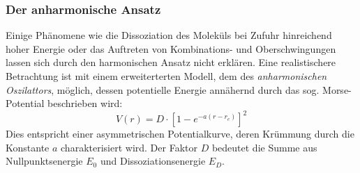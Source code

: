 \documentclass{article}
\begin{document}
\subsubsection{Der anharmonische Ansatz}
Einige Phänomene wie die Dissoziation des Moleküls bei Zufuhr
hinreichend hoher Energie oder das Auftreten von Kombinations- und Oberschwingungen lassen sich durch den
harmonischen Ansatz nicht erklären. Eine realistischere Betrachtung ist mit einem erweiterterten Modell, dem des
\textit{anharmonischen Oszilattors}, möglich, dessen potentielle Energie annähernd durch das sog. Morse-Potential
beschrieben wird:
\begin{equation}
  V(r) = D \cdot [ 1- e^{-a(r-r_e)} ]^2
\end{equation}
Dies entspricht einer asymmetrischen Potentialkurve, deren Krümmung durch die Konstante $a$ charakterisiert wird. Der Faktor $D$
bedeutet die Summe aus Nullpunktsenergie $E _0$ und Dissoziationsenergie $E _D$.
\end{document}
